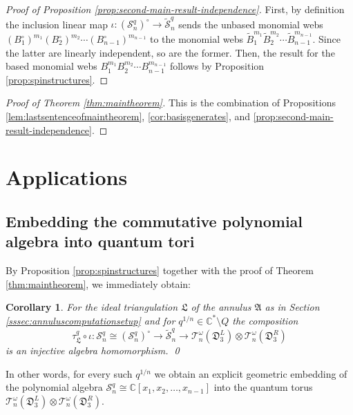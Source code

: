 \documentclass[12pt,
	]{amsart}
\newtheorem{corollary}[theorem]{Corollary}
\theoremstyle{definition}
\renewcommand{\tilde}{\widetilde}
\newcommand{\mbb}[1]{\mathbb{#1}}
\newcommand{\mcal}[1]{\mathcal{#1}}
\newcommand{\mfrak}[1]{\mathfrak{#1}}
\newcommand{\lp}{\left(}\newcommand{\rp}{\right)}
\newcommand{\unbased}[1]{#1^\circ}
\newcommand{\C}{\mbb{C}}
\newcommand{\sC}{\C^\ast}
\newcommand{\sk}{\mcal{S}_n^q}
\newcommand{\usk}{\unbased{\lp\sk\rp}}
\newcommand{\ann}{\mfrak{A}}
\newcommand{\badset}{Q}
\newcommand{\qroot}{q^{1/n}}
\newcommand{\ssk}{\tilde{\mcal{S}}_n^q}
\newcommand{\ttriang}{\mfrak{D}_3}
\newcommand{\idealtriang}{\mfrak{L}}
\newcommand{\wroot}{\omega}
\newcommand{\qtorus}[1]{\mcal{T}_n^\wroot(#1)}
\newcommand{\qtr}{\tau^q_\idealtriang}
\newcommand{\incl}{\iota}
\begin{document}
\begin{proof}[Proof of Proposition {\upshape\ref{prop:second-main-result-independence}}]
First, by definition the inclusion linear map $\incl:\usk\to\ssk$ sends the unbased monomial webs $(\unbased{B}_{1})^{m_1}(\unbased{B}_{2})^{m_2}\cdots(\unbased{B}_{n-1})^{m_{n-1}}$ to the monomial webs $\tilde{B}_{1}^{m_1}\tilde{B}_{2}^{m_2}\cdots \tilde{B}_{n-1}^{m_{n-1}}$.  Since the latter are linearly independent, so are the former.  Then, the result for the based monomial webs $B_{1}^{m_1}B_{2}^{m_2}\cdots B_{n-1}^{m_{n-1}}$ follows by Proposition \ref{prop:spinstructures}.  
\end{proof}

\begin{proof}[Proof of Theorem {\upshape\ref{thm:maintheorem}}]
This is the combination of Propositions \ref{lem:lastsentenceofmaintheorem}, \ref{cor:basisgenerates}, and \ref{prop:second-main-result-independence}.
\end{proof}

\section{Applications}\label{sec:applications}

\subsection{Embedding the commutative polynomial algebra into quantum tori}\label{ssec:injectivity}

By Proposition \ref{prop:spinstructures} together with the proof of Theorem \ref{thm:maintheorem}, we immediately obtain:

\begin{corollary}\label{cor:firstapplication}
For the ideal triangulation $\idealtriang$ of the annulus $\ann$ as in Section {\upshape\ref{sssec:annuluscomputationsetup}} and for $\qroot\in\sC\setminus\badset$ the composition 
\begin{equation*}
\qtr\circ\incl:\sk\cong\usk\to\ssk\to\qtorus{\ttriang^L}\otimes\qtorus{\ttriang^R}
\end{equation*}
is an injective algebra homomorphism.  
\qed
\end{corollary}

In other words, for every such $\qroot$ we obtain an explicit geometric embedding of the polynomial algebra $\sk\cong\C[x_1,x_2,\dots,x_{n-1}]$ into the quantum torus $\qtorus{\ttriang^L}\otimes\qtorus{\ttriang^R}$.
\end{document}
